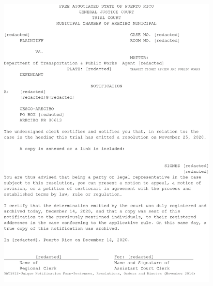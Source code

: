 \documentclass{article}
\begin{document}
\begin{figure}[H]
	\centering
	\includegraphics[width=\textwidth]{../sample_translations/target_1_1.png}
\end{figure}
\end{document}
